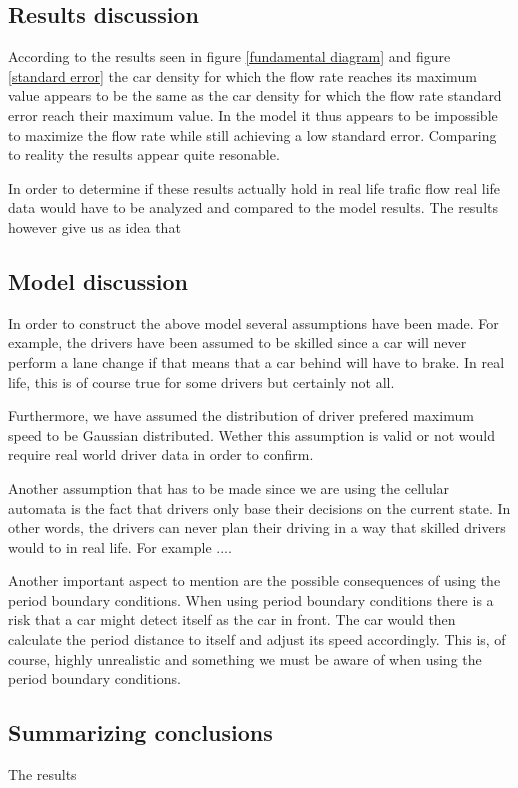 \documentclass[a4paper,12pt]{article}
\begin{document}
\subsection*{Results discussion}
According to the results seen in figure \ref*{fundamental diagram} and figure \ref*{standard error} the car density for which the flow rate reaches its maximum value appears
to be the same as the car density for which the flow rate standard error reach their maximum value. In the model it thus appears to be impossible to maximize the flow rate while still
achieving a low standard error. Comparing to reality the results appear quite resonable.

In order to determine if these results actually hold in real life trafic flow real life data would have to be analyzed and compared to the model results. The results however give us as 
idea that 

\subsection*{Model discussion}
In order to construct the above model several assumptions have been made. For example, the drivers have been assumed to be skilled
since a car will never perform a lane change if that means that a car behind will have to brake. In real life, this is of course true for some drivers 
but certainly not all.

Furthermore, we have assumed the distribution of driver prefered maximum speed to be Gaussian distributed. Wether this assumption is valid or not would require 
real world driver data in order to confirm.

Another assumption that has to be made since we are using the cellular automata is the fact that drivers only base their decisions on the current state. In other words, 
the drivers can never plan their driving in a way that skilled drivers would to in real life. For example ....

Another important aspect to mention are the possible consequences of using the period boundary conditions. When using period boundary conditions there is a risk
that a car might detect itself as the car in front. The car would then calculate the period distance to itself and adjust its speed accordingly. 
This is, of course, highly unrealistic and something we must be aware of when using the period boundary conditions.

\subsection*{Summarizing conclusions}
The results 
\end{document}
